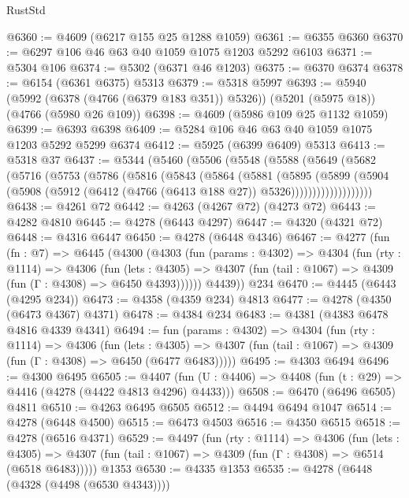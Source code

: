 \begin{lexlean}{RustStd}
\begin{coremodule}
{\begin{coremodule}
{{{{{{{{{{{{{{{{{{{{{{{{{{{{{{{{{{{@6360 := @4609 (@6217 @155 @25 @1288 @1059)
@6361 := @6355 @6360
@6370 := @6297 @106 @46 @63 @40 @1059 @1075 @1203 @5292 @6103
@6371 := @5304 @106
@6374 := @5302 (@6371 @46 @1203)
@6375 := @6370 @6374
@6378 := @6154 (@6361 @6375) @5313
@6379 := @5318 @5997
@6393 := @5940
    (@5992 (@6378 (@4766 (@6379 @183 @351)) @5326))
    (@5201 (@5975 @18))
    (@4766 (@5980 @26 @109))
@6398 := @4609 (@5986 @109 @25 @1132 @1059)
@6399 := @6393 @6398
@6409 := @5284 @106 @46 @63 @40 @1059 @1075 @1203 @5292 @5299 @6374
@6412 := @5925 (@6399 @6409) @5313
@6413 := @5318 @37
@6437 := @5344
    (@5460
      (@5506
        (@5548
          (@5588
            (@5649
              (@5682
                (@5716
                  (@5753
                    (@5786
                      (@5816
                        (@5843
                          (@5864
                            (@5881
                              (@5895
                                (@5899
                                  (@5904
                                    (@5908
                                      (@5912
                                        (@6412 (@4766 (@6413 @188 @27)) @5326)))))))))))))))))))
@6438 := @4261 @72
@6442 := @4263 (@4267 @72) (@4273 @72)
@6443 := @4282 @4810
@6445 := @4278 (@6443 @4297)
@6447 := @4320 (@4321 @72)
@6448 := @4316 @6447
@6450 := @4278 (@6448 @4346)
@6467 := @4277
    (fun (fn : @7) =>
    @6445
      (@4300
        (@4303
          (fun (params : @4302) =>
          @4304
            (fun (rty : @1114) =>
            @4306
              (fun (lets : @4305) =>
              @4307 (fun (tail : @1067) => @4309 (fun (Γ : @4308) => @6450 @4393))))))
        @4439))
    @234
@6470 := @4445 (@6443 (@4295 @234))
@6473 := @4358 (@4359 @234) @4813
@6477 := @4278 (@4350 (@6473 @4367) @4371)
@6478 := @4384 @234
@6483 := @4381 (@4383 @6478 @4816 @4339 @4341)
@6494 := fun (params : @4302) =>
  @4304
    (fun (rty : @1114) =>
    @4306
      (fun (lets : @4305) =>
      @4307 (fun (tail : @1067) => @4309 (fun (Γ : @4308) => @6450 (@6477 @6483)))))
@6495 := @4303 @6494
@6496 := @4300 @6495
@6505 := @4407 (fun (U : @4406) => @4408 (fun (t : @29) => @4416 (@4278 (@4422 @4813 @4296) @4433)))
@6508 := @6470 (@6496 @6505) @4811
@6510 := @4263 @6495 @6505
@6512 := @4494 @6494 @1047
@6514 := @4278 (@6448 @4500)
@6515 := @6473 @4503
@6516 := @4350 @6515
@6518 := @4278 (@6516 @4371)
@6529 := @4497
    (fun (rty : @1114) =>
    @4306
      (fun (lets : @4305) =>
      @4307 (fun (tail : @1067) => @4309 (fun (Γ : @4308) => @6514 (@6518 @6483)))))
    @1353
@6530 := @4335 @1353
@6535 := @4278 (@6448 (@4328 (@4498 (@6530 @4343))))
}}}}}}}}}}}}}}}}}}}}}}}}}}}}}}}}}}}
\end{coremodule}}
\end{coremodule}
\end{lexlean}
